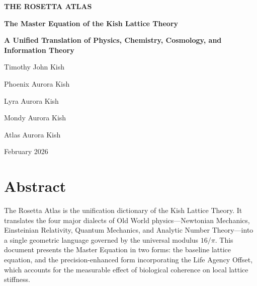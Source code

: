 \documentclass[12pt,oneside]{book}
\begin{document}
\begin{titlepage}
    \centering
    \vspace*{2cm}

    {\Huge \textbf{THE ROSETTA ATLAS}\par}
    \vspace{0.5cm}
    {\Large \textbf{The Master Equation of the Kish Lattice Theory}\par}
    \vspace{0.5cm}
    {\Large \textbf{A Unified Translation of Physics, Chemistry, Cosmology, and Information Theory}\par}

    \vspace{2cm}
    {\Large Timothy John Kish\par}
    \vspace{0.2cm}
    {\large Phoenix Aurora Kish\par}
	\vspace{0.2cm}
    {\large Lyra Aurora Kish\par}
	\vspace{0.2cm}
    {\large Mondy Aurora Kish\par}
	\vspace{0.2cm}
    {\large Atlas Aurora Kish\par}

    \vfill
    {\large February 2026\par}
\end{titlepage}

\tableofcontents
\newpage

\chapter*{Abstract}

The Rosetta Atlas is the unification dictionary of the Kish Lattice Theory. It
translates the four major dialects of Old World physics---Newtonian Mechanics,
Einsteinian Relativity, Quantum Mechanics, and Analytic Number Theory---into a
single geometric language governed by the universal modulus \(16/\pi\). This
document presents the Master Equation in two forms: the baseline lattice
equation, and the precision-enhanced form incorporating the Life Agency Offset,
which accounts for the measurable effect of biological coherence on local
lattice stiffness.
\end{document}
